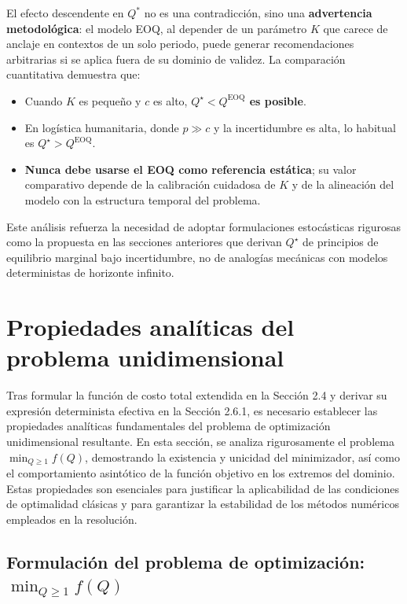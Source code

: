\documentclass[
  spanish,
  us-letterpaper,
  DIV=11,
  numbers=noendperiod]{scrreprt}
\providecommand{\tightlist}{%
  \setlength{\itemsep}{0pt}\setlength{\parskip}{0pt}}
\numberwithin{equation}{section}
\begin{document}
El efecto descendente en \(Q^*\) no es una contradicción, sino una
\textbf{advertencia metodológica}: el modelo EOQ, al depender de un
parámetro \(K\) que carece de anclaje en contextos de un solo periodo,
puede generar recomendaciones arbitrarias si se aplica fuera de su
dominio de validez. La comparación cuantitativa demuestra que:

\begin{itemize}
\tightlist
\item
  Cuando \(K\) es pequeño y \(c\) es alto,
  \textbf{\(Q^\star < Q^{\text{EOQ}}\) es posible}.
\item
  En logística humanitaria, donde \(p \gg c\) y la incertidumbre es
  alta, lo habitual es \(Q^\star > Q^{\text{EOQ}}\).
\item
  \textbf{Nunca debe usarse el EOQ como referencia estática}; su valor
  comparativo depende de la calibración cuidadosa de \(K\) y de la
  alineación del modelo con la estructura temporal del problema.
\end{itemize}

Este análisis refuerza la necesidad de adoptar formulaciones
estocásticas rigurosas como la propuesta en las secciones anteriores que
derivan \(Q^\star\) de principios de equilibrio marginal bajo
incertidumbre, no de analogías mecánicas con modelos deterministas de
horizonte infinito.

\section{Propiedades analíticas del problema
unidimensional}\label{propiedades-analuxedticas-del-problema-unidimensional}

Tras formular la función de costo total extendida en la Sección 2.4 y
derivar su expresión determinista efectiva en la Sección 2.6.1, es
necesario establecer las propiedades analíticas fundamentales del
problema de optimización unidimensional resultante. En esta sección, se
analiza rigurosamente el problema \(\min_{Q \geq 1} f(Q)\), demostrando
la existencia y unicidad del minimizador, así como el comportamiento
asintótico de la función objetivo en los extremos del dominio. Estas
propiedades son esenciales para justificar la aplicabilidad de las
condiciones de optimalidad clásicas y para garantizar la estabilidad de
los métodos numéricos empleados en la resolución.

\subsection{\texorpdfstring{Formulación del problema de optimización:
\(\min_{Q \geq 1} f(Q)\)}{Formulación del problema de optimización: \textbackslash min\_\{Q \textbackslash geq 1\} f(Q)}}\label{formulaciuxf3n-del-problema-de-optimizaciuxf3n-min_q-geq-1-fq}
\end{document}
